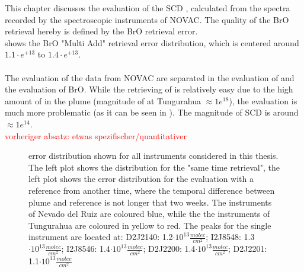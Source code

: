 This chapter discusses the evaluation of the  SCD , calculated from the spectra recorded by the spectroscopic instruments of NOVAC. The quality of the BrO retrieval hereby is defined by the BrO retrieval error.\\
 shows the BrO "Multi Add" retrieval error distribution, which is centered around $1.1\cdot e^{+13}$ to $1.4\cdot e^{+13}$. \\
\\
The evaluation of the data from NOVAC are separated in the evaluation of  and the evaluation of BrO. While the retrieving of  is relatively easy due to the high amount of  in the plume (magnitude of  at Tungurahua $\approx 1e^{18}$), the  evaluation is much more problematic (as it can be seen in ). The magnitude of  SCD is around $\approx 1e^{14}$. \\
\textcolor{red}{vorheriger absatz: etwas spezifischer/quantitativer}
%
\begin{figure}
	\caption{ error distribution shown for all instruments considered in this thesis. The left plot shows the  distribution for the "same time retrieval", the left plot shows the  error distribution for the evaluation with a reference from another time, where the temporal difference between plume and reference is not longer that two weeks. The instruments of Nevado del Ruiz are coloured blue, while the the instruments of Tungurahua are coloured in yellow to red.
	The peaks for the single instrument are located at: D2J2140: 1.2$\cdot 10^{13}\frac{molec}{cm^2}$; I2J8548: 1.3$\cdot 10^{13}\frac{molec}{cm^2}$;
		I2J8546: 1.4$\cdot 10^{13}\frac{molec}{cm^2}$;
		D2J2200: 1.4$\cdot 10^{13}\frac{molec}{cm^2}$;
		D2J2201: 1.1$\cdot 10^{13}\frac{molec}{cm^2}$}
	\label{fig:allbroerrordistribution}
\end{figure}

